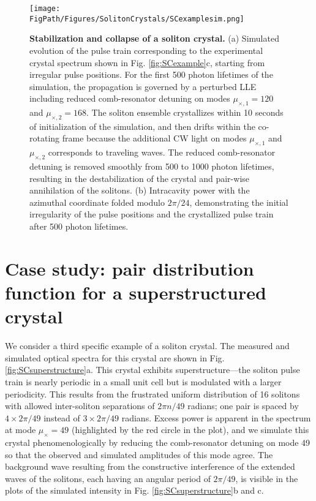 \begin{figure}[htpb]
	\begin{center}
		\texttt{[image: \\FigPath/Figures/SolitonCrystals/SCexamplesim.png]}
	\end{center}
	\caption[Stabilization and collapse of a soliton crystal]{\textbf{Stabilization and collapse of a soliton crystal.} (a) Simulated evolution of the pulse train corresponding to the experimental crystal spectrum shown in Fig. \ref{fig:SCexample}c, starting from irregular pulse positions. For the first 500 photon lifetimes of the simulation, the propagation is governed by a perturbed LLE including reduced comb-resonator detuning on modes $\mu_{\times,1}=120$ and $\mu_{\times,2}=168$. The soliton ensemble crystallizes within 10 seconds of initialization of the simulation, and then drifts within the co-rotating frame because the additional CW light on modes $\mu_{\times,1}$ and $\mu_{\times,2}$ corresponds to traveling waves. The reduced comb-resonator detuning is removed smoothly from 500 to 1000 photon lifetimes, resulting in the destabilization of the crystal and pair-wise annihilation of the solitons. (b) Intracavity power with the azimuthal coordinate folded modulo $2\pi/24$, demonstrating the initial irregularity of the pulse positions and the crystallized pulse train after 500 photon lifetimes.}
	\label{fig:SCexamplesim}
\end{figure} 


\section{Case study: pair distribution function for a superstructured crystal}

We consider a third specific example of a soliton crystal. The measured and simulated optical spectra for this crystal are shown in Fig. \ref{fig:SCsuperstructure}a. This crystal exhibits superstructure---the soliton pulse train is nearly periodic in a small unit cell but is modulated with a larger periodicity. This results from the frustrated uniform distribution of 16 solitons with allowed inter-soliton separations of $2\pi n/49$ radians; one pair is spaced by $4 \times 2\pi/49$ instead of $3 \times 2\pi/49$ radians.  Excess power is apparent in the spectrum at mode $\mu_\times=49$ (highlighted by the red circle in the plot), and we simulate this crystal phenomenologically by reducing the comb-resonator detuning on mode 49 so that the observed and simulated amplitudes of this mode agree. The background wave resulting from the constructive interference of the extended waves of the solitons, each having an angular period of $2\pi/49$, is visible in the plots of the simulated intensity in Fig. \ref{fig:SCsuperstructure}b and c.

